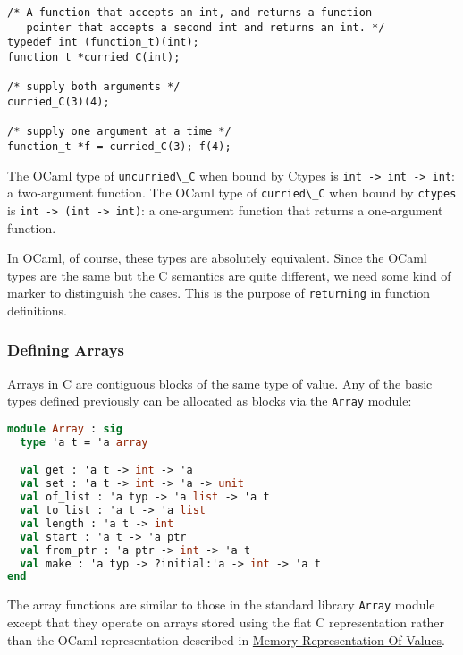 \begin{lstlisting}
/* A function that accepts an int, and returns a function
   pointer that accepts a second int and returns an int. */
typedef int (function_t)(int);
function_t *curried_C(int);

/* supply both arguments */
curried_C(3)(4);

/* supply one argument at a time */
function_t *f = curried_C(3); f(4);
\end{lstlisting}

The OCaml type of \passthrough{\lstinline!uncurried\_C!} when bound by
Ctypes is \passthrough{\lstinline!int -> int -> int!}: a two-argument
function. The OCaml type of \passthrough{\lstinline!curried\_C!} when
bound by \passthrough{\lstinline!ctypes!} is
\passthrough{\lstinline!int -> (int -> int)!}: a one-argument function
that returns a one-argument function.

In OCaml, of course, these types are absolutely equivalent. Since the
OCaml types are the same but the C semantics are quite different, we
need some kind of marker to distinguish the cases. This is the purpose
of \passthrough{\lstinline!returning!} in function definitions.

\hypertarget{defining-arrays}{%
\subsubsection{Defining Arrays}\label{defining-arrays}}

Arrays in C are contiguous blocks of the same type of value. Any of the
basic types defined previously can be allocated as blocks via the
\passthrough{\lstinline!Array!} module:

\begin{lstlisting}[language=Caml]
module Array : sig
  type 'a t = 'a array

  val get : 'a t -> int -> 'a
  val set : 'a t -> int -> 'a -> unit
  val of_list : 'a typ -> 'a list -> 'a t
  val to_list : 'a t -> 'a list
  val length : 'a t -> int
  val start : 'a t -> 'a ptr
  val from_ptr : 'a ptr -> int -> 'a t
  val make : 'a typ -> ?initial:'a -> int -> 'a t
end
\end{lstlisting}

The array functions are similar to those in the standard library
\passthrough{\lstinline!Array!} module except that they operate on
arrays stored using the flat C representation rather than the OCaml
representation described in
\href{runtime-memory-layout.html\#memory-representation-of-values}{Memory
Representation Of Values}.

